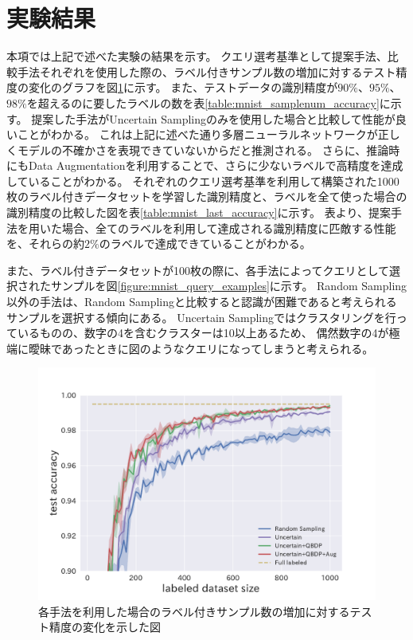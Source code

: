 \section{実験結果}
本項では上記で述べた実験の結果を示す。
クエリ選考基準として提案手法、比較手法それぞれを使用した際の、ラベル付きサンプル数の増加に対するテスト精度の変化のグラフを図\ref{fig:mnist_acc_graph}に示す。
また、テストデータの識別精度が$90\%$、$95\%$、$98\%$を超えるのに要したラベルの数を表\ref{table:mnist_samplenum_accuracy}に示す。
提案した手法がUncertain Samplingのみを使用した場合と比較して性能が良いことがわかる。
これは上記に述べた通り多層ニューラルネットワークが正しくモデルの不確かさを表現できていないからだと推測される。
さらに、推論時にもData Augmentationを利用することで、さらに少ないラベルで高精度を達成していることがわかる。
それぞれのクエリ選考基準を利用して構築された1000枚のラベル付きデータセットを学習した識別精度と、ラベルを全て使った場合の識別精度の比較した図を表\ref{table:mnist_last_accuracy}に示す。
表より、提案手法を用いた場合、全てのラベルを利用して達成される識別精度に匹敵する性能を、それらの約$2\%$のラベルで達成できていることがわかる。

また、ラベル付きデータセットが100枚の際に、各手法によってクエリとして選択されたサンプルを図\ref{figure:mnist_query_examples}に示す。
Random Sampling以外の手法は、Random Samplingと比較すると認識が困難であると考えられるサンプルを選択する傾向にある。
Uncertain Samplingではクラスタリングを行っているものの、数字の4を含むクラスターは10以上あるため、
偶然数字の4が極端に曖昧であったときに図のようなクエリになってしまうと考えられる。


\begin{figure}[h]
     \begin{center}
      \includegraphics[width=12cm]{figures/mnist_acc_graph.pdf}
     \end{center}
    \caption{\label{fig:mnist_acc_graph}各手法を利用した場合のラベル付きサンプル数の増加に対するテスト精度の変化を示した図}
\end{figure}

